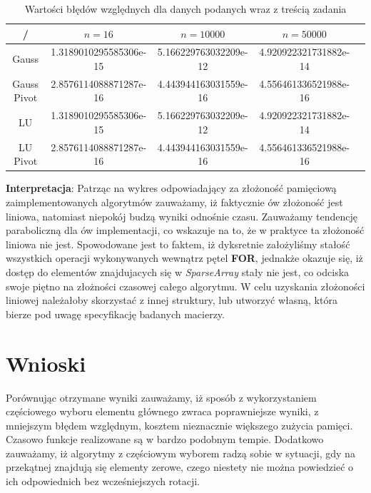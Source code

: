 \documentclass[a4paper,14pt]{report}
\begin{document}
  \begin{table}[H]
    \begin{tabular}{|c | c | c | c | c |} 
     \hline
     / &  $n=16$ & $n=10000$ & $n=50000$\\ [0.5ex] 
     \hline\hline
     Gauss & 1.3189010295585306e-15 & 5.166229763032209e-12 & 4.920922321731882e-14 \\
     Gauss Pivot & 2.8576114088871287e-16 & 4.443944163031559e-16 & 4.556461336521988e-16 \\ 
     LU & 1.3189010295585306e-15 & 5.166229763032209e-12 & 4.920922321731882e-14 \\ 
     LU Pivot & 2.8576114088871287e-16 & 4.443944163031559e-16 & 4.556461336521988e-16\\ 
     \hline
    \end{tabular}
    \caption{Wartości błędów względnych dla danych podanych wraz z treścią zadania}
    \end{table}
  \textbf{Interpretacja}: Patrząc na wykres odpowiadający za złożoność pamięciową zaimplementowanych algorytmów zauważamy, iż faktycznie ów złożoność jest liniowa, natomiast niepokój budzą wyniki odnośnie czasu. Zauważamy tendencję paraboliczną dla ów implementacji, co wskazuje na to, że w praktyce ta złożoność liniowa nie jest. Spowodowane jest to faktem, iż dyksretnie założyliśmy stałość wszystkich operacji wykonywanych wewnątrz pętel \textbf{FOR}, jednakże okazuje się, iż dostęp do elementów znajdujacych się w \textit{SparseArray} stały nie jest, co odciska swoje piętno na złożności czasowej całego algorytmu. W celu uzyskania złożoności liniowej należałoby skorzystać z innej struktury, lub utworzyć własną, która bierze pod uwagę specyfikację badanych macierzy.

\chapter{Wnioski}
  Porównując otrzymane wyniki zauważamy, iż sposób z wykorzystaniem częściowego wyboru elementu głównego zwraca poprawniejsze wyniki, z mniejszym błędem względnym, kosztem nieznacznie większego zużycia pamięci. Czasowo funkcje realizowane są w bardzo podobnym tempie. Dodatkowo zauważamy, iż algorytmy z częściowym wyborem radzą sobie w sytuacji, gdy na przekątnej znajdują się elementy zerowe, czego niestety nie można powiedzieć o ich odpowiednich bez wcześniejszych rotacji.
\end{document}
